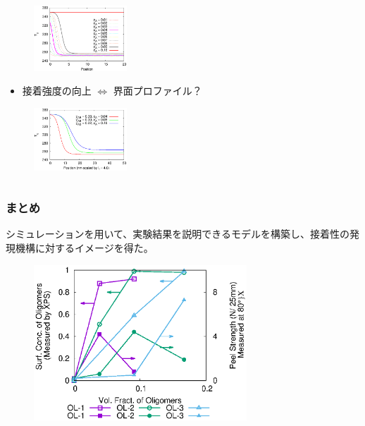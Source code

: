 \documentclass[12pt, dvipdfmx]{beamer}
\begin{document}
\begin{frame}
\begin{columns}
\begin{column}{6.0cm}
{		\vspace{-1\baselineskip}
		\begin{figure}[htbp]
			\begin{center}
				\includegraphics[width=35mm]{A6_B600_Chi_03_chiS_0.0_Tg.eps}
			\end{center}
		\end{figure}

		\vspace{-1\baselineskip}
		\begin{itemize}
			\item 接着強度の向上 $\Leftrightarrow$ 界面プロファイル？
		\end{itemize}
		
		\vspace{-1\baselineskip}
		\begin{figure}[htbp]
			\begin{center}
				\includegraphics[width=35mm]{Tg.eps}
			\end{center}
		\end{figure}
	}
	\end{column}
\end{columns}

\end{frame}

\begin{frame}\frametitle{まとめ}

シミュレーションを用いて、実験結果を説明できる\color{red}モデルを構築\color{black}し、接着性の\color{red}発現機構に対するイメージ\color{black}を得た。

\vspace{-0.5\baselineskip}
\begin{figure}[!b]
	\begin{center}
		\includegraphics[width=80mm]{Exp_Data_color.eps}
	\end{center}
\end{figure}

\end{frame}
\end{document}
